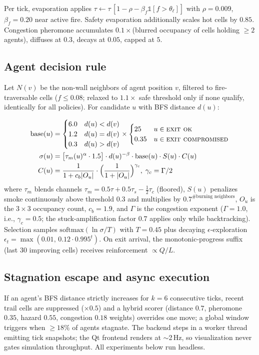 \documentclass[conference]{IEEEtran}
\begin{document}
Per tick, evaporation applies $\tau\leftarrow\tau\,[1-\rho-\beta_f\mathbb{1}[f>\theta_{\ell}]]$ with $\rho{=}0.009$, $\beta_f{=}0.20$ near active fire. Safety evaporation additionally scales hot cells by $0.85$. Congestion pheromone accumulates $0.1\times$(blurred occupancy of cells holding $\geq2$ agents), diffuses at $0.3$, decays at $0.05$, capped at $5$.

\subsection{Agent decision rule}
Let $N(v)$ be the non-wall neighbors of agent position $v$, filtered to fire-traversable cells ($f\leq0.08$; relaxed to $1.1\times$ safe threshold only if none qualify, identically for all policies). For candidate $u$ with BFS distance $d(u)$:

\begin{equation}
\begin{aligned}
\mathrm{base}(u)&=\begin{cases}6.0 & d(u)<d(v)\\ 1.2 & d(u)=d(v)\\ 0.3 & d(u)>d(v)\end{cases}
\times\begin{cases}25 & u\in\textsc{exit ok}\\ 0.35 & u\in\textsc{exit compromised}\end{cases}\\
\sigma(u)&=\bigl[\tau_m(u)^{\alpha}\cdot1.5\bigr]\cdot d(u)^{-\beta}\cdot\mathrm{base}(u)\cdot S(u)\cdot C(u)\\
C(u)&=\frac{1}{1+c_b |O_{u}|}\cdot\Bigl(\frac{1}{1+|O_{u}|}\Bigr)^{\gamma_c},\;\gamma_c=\Gamma/2
\end{aligned}
\label{eq:score}
\end{equation}
where $\tau_m$ blends channels $\tau_m=0.5\tau+0.5\tau_s-\tfrac12\tau_c$ (floored), $S(u)$ penalizes smoke continuously above threshold $0.3$ and multiplies by $0.7^{\#\text{burning neighbors}}$, $O_u$ is the $3\times3$ occupancy count, $c_b{=}1.9$, and $\Gamma$ is the congestion exponent ($\Gamma{=}1.0$, i.e., $\gamma_c{=}0.5$; the stuck-amplification factor $0.7$ applies only while backtracking). Selection samples $\mathrm{softmax}(\ln\sigma/T)$ with $T{=}0.45$ plus decaying $\epsilon$-exploration $\epsilon_t=\max(0.01,\,0.12\cdot0.995^{t})$. On exit arrival, the monotonic-progress suffix (last 30 improving cells) receives reinforcement $\propto Q/L$.

\subsection{Stagnation escape and async execution}
If an agent's BFS distance strictly increases for $k{=}6$ consecutive ticks, recent trail cells are suppressed ($\times0.5$) and a hybrid scorer (distance $0.7$, pheromone $0.35$, hazard $0.55$, congestion $0.18$ weights) overrides one move; a global window triggers when $\geq18\%$ of agents stagnate. The backend steps in a worker thread emitting tick snapshots; the Qt frontend renders at $\sim$2\,Hz, so visualization never gates simulation throughput. All experiments below run headless.
\end{document}
